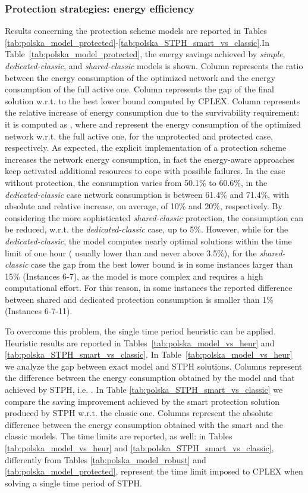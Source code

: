 \documentclass[final,5p,times,twocolumn]{elsarticle}
\begin{document}
\subsubsection{Protection strategies: energy efficiency}
Results concerning the protection scheme models are reported in Tables \ref{tab:polska_model_protected}-\ref{tab:polska_STPH_smart_vs_classic}.In Table~\ref{tab:polska_model_protected}, the energy savings achieved by \textit{simple}, \textit{dedicated-classic}, and \textit{shared-classic} models is shown.  Column  represents the ratio between the energy consumption of the optimized network and the energy consumption of the full active one. Column  represents the gap of the final solution w.r.t. to the best lower bound computed by CPLEX. Column  represents the relative increase of energy consumption due to the survivability requirement: it is computed as , where   and  represent the energy consumption of the optimized network w.r.t. the full active one, for the unprotected and protected case, respectively.    
  As expected, the explicit implementation of a protection scheme increases the network energy consumption, in fact the energy-aware approaches keep activated additional resources to cope with possible failures. In the case without protection, the consumption  varies from 50.1\% to 60.6\%, in the \textit{dedicated-classic} case network consumption is between 61.4\% and 71.4\%, with absolute and relative increase, on average, of 10\% and 20\%, respectively. By considering the more sophisticated \textit{shared-classic} protection, the consumption can be reduced, w.r.t. the \textit{dedicated-classic} case, up to 5\%. However, while for the \textit{dedicated-classic}, the model computes nearly optimal solutions within the time limit of one hour (  usually lower than  and never above 3.5\%), for the \textit{shared-classic} case the gap from the best lower bound is in some instances larger than 15\% (Instances 6-7), as the model is more complex and requires a high computational effort. For this reason, in some instances the reported difference between shared and dedicated protection consumption is smaller than 1\% (Instances 6-7-11). 
  
  To overcome this problem, the single time period heuristic can be applied. Heuristic results are reported in Tables~\ref{tab:polska_model_vs_heur} and \ref{tab:polska_STPH_smart_vs_classic}.
In Table~\ref{tab:polska_model_vs_heur} we analyze the gap between exact model and STPH solutions.
Columns  represent the difference between the energy consumption obtained by the model and that achieved by STPH, i.e.  .  In Table \ref{tab:polska_STPH_smart_vs_classic}  we compare the saving improvement achieved by the smart protection solution produced by STPH w.r.t. the classic one. Columns  represent the absolute difference between the energy consumption obtained with the smart and the classic models. The time limits are reported, as well: in Tables \ref{tab:polska_model_vs_heur} and \ref{tab:polska_STPH_smart_vs_classic}, differently from Tables \ref{tab:polska_model_robust} and \ref{tab:polska_model_protected},  represent the time limit imposed to CPLEX when solving a single time period of STPH.
\end{document}
